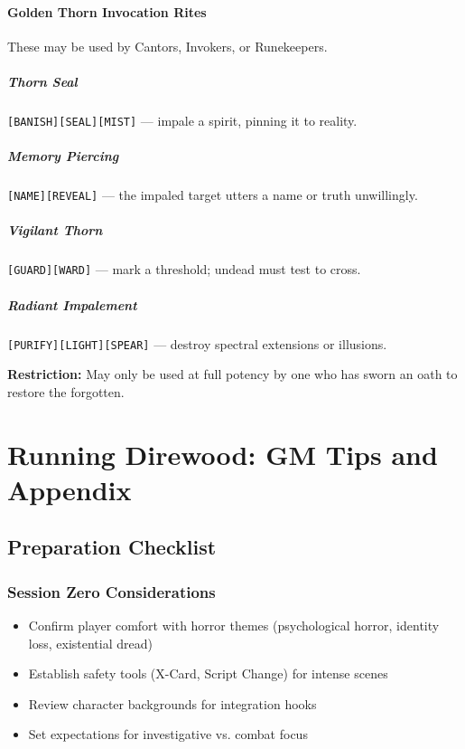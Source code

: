 \documentclass[11pt]{article}
\begin{document}
\subsubsection*{Golden Thorn Invocation Rites}
These may be used by Cantors, Invokers, or Runekeepers.

\paragraph*{Thorn Seal}
\texttt{[BANISH][SEAL][MIST]} --- impale a spirit, pinning it to reality.

\paragraph*{Memory Piercing}
\texttt{[NAME][REVEAL]} --- the impaled target utters a name or truth unwillingly.

\paragraph*{Vigilant Thorn}
\texttt{[GUARD][WARD]} --- mark a threshold; undead must test to cross.

\paragraph*{Radiant Impalement}
\texttt{[PURIFY][LIGHT][SPEAR]} --- destroy spectral extensions or illusions.

\noindent
\textbf{Restriction:}  
May only be used at full potency by one who has sworn an oath to restore the forgotten.

\appendix
\chapter{Running Direwood: GM Tips and Appendix}

\section{Preparation Checklist}

\subsection{Session Zero Considerations}
\begin{itemize}
    \item Confirm player comfort with horror themes (psychological horror, identity loss, existential dread)
    \item Establish safety tools (X-Card, Script Change) for intense scenes
    \item Review character backgrounds for integration hooks
    \item Set expectations for investigative vs. combat focus
\end{itemize}
\end{document}
